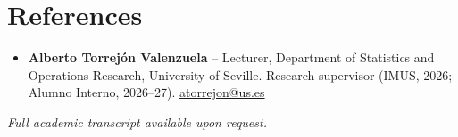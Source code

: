 \documentclass[11pt, a4paper]{article}
\begin{document}
	\section*{References}
	\begin{itemize}
		\item[] \textbf{Alberto Torrejón Valenzuela} -- Lecturer, Department of Statistics and Operations Research, University of Seville. Research supervisor (IMUS, 2026; Alumno Interno, 2026--27). \href{mailto:atorrejon@us.es}{atorrejon@us.es}
	\end{itemize}

	\vfill
	\begin{center}
		\textit{Full academic transcript available upon request.}
	\end{center}
\end{document}
